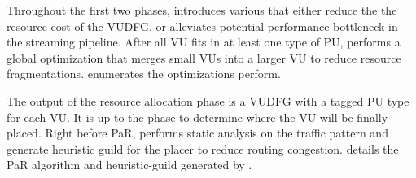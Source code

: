 Throughout the first two phases, \name introduces various  that either reduce the
the resource cost of the VUDFG, or alleviates potential performance bottleneck in the streaming
pipeline.
After all VU fits in at least one type of PU, \name performs a global optimization that merges small VUs into a larger VU to reduce resource fragmentations.
 enumerates the optimizations \name perform.

The output of the resource allocation phase is a VUDFG with a tagged PU type for each VU.
It is up to the
 phase to determine where the VU will be finally placed.
Right before PaR, \name performs static analysis on the traffic pattern and generate heuristic guild
for the placer to reduce routing congestion.
 details the PaR algorithm and heuristic-guild generated by \name.


